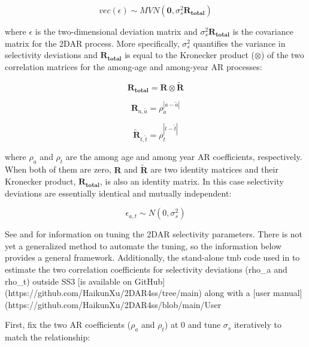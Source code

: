 \begin{equation}
vec(\epsilon) \sim MVN(\mathbf{0},\sigma_s^2\mathbf{R_{total}})
\end{equation}

where $\epsilon$ is the two-dimensional deviation matrix and $\sigma_s^2\mathbf{R_{total}}$ is the covariance matrix for the 2DAR process. More specifically, $\sigma_s^2$ quantifies the variance in selectivity deviations and $\mathbf{R_{total}}$ is equal to the Kronecker product ($\otimes$) of the two correlation matrices for the among-age and among-year AR processes:

\begin{equation}
\mathbf{R_{total}}=\mathbf{R}\otimes\mathbf{\tilde{R}}
\end{equation}

\begin{equation}
\mathbf{R}_{a,\tilde{a}}=\rho_a^{|a-\tilde{a}|}
\end{equation}

\begin{equation}
\mathbf{\tilde{R}}_{t,\tilde{t}}=\rho_t^{|t-\tilde{t}|}
\end{equation}

where $\rho_a$ and $\rho_t$ are the among age and among year AR coefficients, respectively. When both of them are zero, $\mathbf{R}$ and $\mathbf{\tilde{R}}$ are two identity matrices and their Kronecker product, $\mathbf{R_{total}}$, is also an identity matrix. In this case selectivity deviations are essentially identical and mutually independent:

\begin{equation}
\epsilon_{a,t}\sim N(0,\sigma_s^2)
\end{equation} 

See \citet{xu-new-2019} and \citet{xu-comparing-2020} for information on tuning the 2DAR selectivity parameters. There is not yet a generalized method to automate the tuning, so the information below provides a general framework. Additionally, the stand-alone \gls{tmb} code used in \citet{xu-new-2019} to estimate the two correlation coefficients for selectivity deviations (rho\_a and rho\_t) outside SS3 [is available on GitHub](https://github.com/HaikunXu/2DAR4ss/tree/main) along with a [user manual](https://github.com/HaikunXu/2DAR4ss/blob/main/User%

First, fix the two AR coefficients ($\rho_a$ and $\rho_t$) at 0 and tune $\sigma_s$ iteratively to match the relationship:

